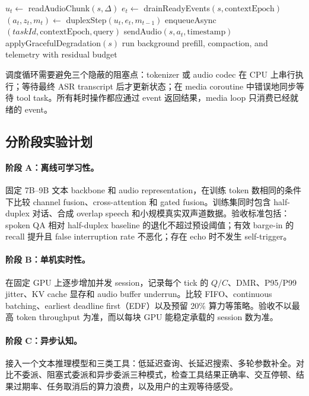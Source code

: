 \documentclass[UTF8,fontset=none,a4paper,10pt]{ctexart}
\begin{document}
\begin{algorithm}[H]
\caption{Deadline-aware duplex session loop}
\begin{algorithmic}[1]
  \State $u_t\gets$ readAudioChunk$(s,\Delta)$
  \State $e_t\gets$ drainReadyEvents$(s,\mathrm{contextEpoch})$
  \State $(a_t,z_t,m_t)\gets$ duplexStep$(u_t,e_t,m_{t-1})$
    \State enqueueAsync$(taskId,\mathrm{contextEpoch},\mathrm{query})$
  \EndIf
    \State sendAudio$(s,a_t,\mathrm{timestamp})$
  \Else
    \State applyGracefulDegradation$(s)$
  \EndIf
\EndFor
\State run background prefill, compaction, and telemetry with residual budget
\end{algorithmic}
\end{algorithm}

调度循环需要避免三个隐蔽的阻塞点：tokenizer 或 audio codec 在 CPU 上串行执行；等待最终 ASR transcript 后才更新状态；在 media coroutine 中错误地同步等待 tool task。所有耗时操作都应通过 event 返回结果，media loop 只消费已经就绪的 event。

\subsection{分阶段实验计划}

\paragraph{阶段 A：离线可学习性。}
固定 7B--9B 文本 backbone 和 audio representation，在训练 token 数相同的条件下比较 channel fusion、cross-attention 和 gated fusion。训练集同时包含 half-duplex 对话、合成 overlap speech 和小规模真实双声道数据。验收标准包括：spoken QA 相对 half-duplex baseline 的退化不超过预设阈值；有效 barge-in 的 recall 提升且 false interruption rate 不恶化；存在 echo 时不发生 self-trigger。

\paragraph{阶段 B：单机实时性。}
在固定 GPU 上逐步增加并发 session，记录每个 tick 的 $Q/C$、DMR、P95/P99 jitter、KV cache 显存和 audio buffer underrun。比较 FIFO、continuous batching、earliest deadline first（EDF）以及预留 20\% 算力等策略。验收不以最高 token throughput 为准，而以每块 GPU 能稳定承载的 session 数为准。

\paragraph{阶段 C：异步认知。}
接入一个文本推理模型和三类工具：低延迟查询、长延迟搜索、多轮参数补全。对比不委派、阻塞式委派和异步委派三种模式，检查工具结果正确率、交互停顿、结果过期率、任务取消后的算力浪费，以及用户的主观等待感受。
\end{document}
